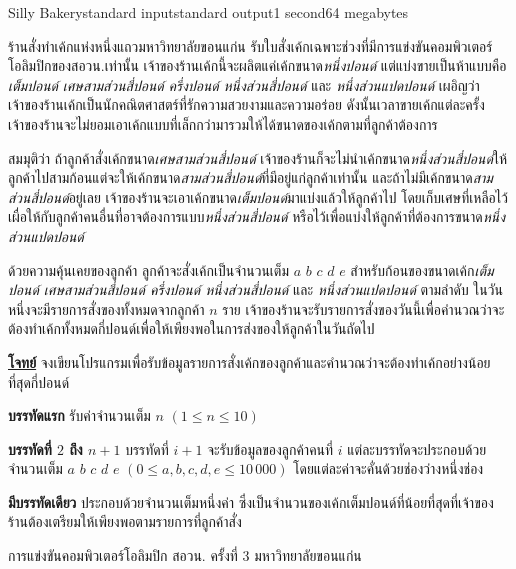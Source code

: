 \documentclass[11pt,a4paper]{article}
\begin{document}
\begin{problem}{Silly Bakery}{standard input}{standard output}{1 second}{64 megabytes}

ร้านสั่งทำเค้กแห่งหนึ่งแถวมหาวิทยาลัยขอนแก่น รับใบสั่งเค้กเฉพาะช่วงที่มีการแข่งขันคอมพิวเตอร์โอลิมปิกของสอวน.เท่านั้น เจ้าของร้านเค้กนี้จะผลิตแค่เค้กขนาด\textit{หนึ่งปอนด์ }แต่แบ่งขายเป็นห้าแบบคือ \textit{เต็มปอนด์} \textit{เศษสามส่วนสี่ปอนด์} \textit{ครึ่งปอนด์} \textit{หนึ่งส่วนสี่ปอนด์} และ \textit{หนึ่งส่วนแปดปอนด์} เผอิญว่าเจ้าของร้านเค้กเป็นนักคณิตศาสตร์ที่รักความสวยงามและความอร่อย ดังนั้นเวลาขายเค้กแต่ละครั้งเจ้าของร้านจะไม่ยอมเอาเค้กแบบที่เล็กกว่ามารวมให้ได้ขนาดของเค้กตามที่ลูกค้าต้องการ

สมมุติว่า ถ้าลูกค้าสั่งเค้กขนาด\textit{เศษสามส่วนสี่ปอนด์} เจ้าของร้านก็จะไม่นำเค้กขนาด\textit{หนึ่งส่วนสี่ปอนด์}ให้ลูกค้าไปสามก้อนแต่จะให้เค้กขนาด\textit{สามส่วนสี่ปอนด์}ที่มีอยู่แก่ลูกค้าเท่านั้น และถ้าไม่มีเค้กขนาด\textit{สามส่วนสี่ปอนด์}อยู่เลย เจ้าของร้านจะเอาเค้กขนาด\textit{เต็มปอนด์}มาแบ่งแล้วให้ลูกค้าไป โดยเก็บเศษที่เหลือไว้เผื่อให้กับลูกค้าคนอื่นที่อาจต้องการแบบ\textit{หนึ่งส่วนสี่ปอนด์} หรือไว้เพื่อแบ่งให้ลูกค้าที่ต้องการขนาด\textit{หนึ่งส่วนแปดปอนด์}

ด้วยความคุ้นเคยของลูกค้า ลูกค้าจะสั่งเค้กเป็นจำนวนเต็ม $a$ $b$ $c$ $d$ $e$ สำหรับก้อนของขนาดเค้ก\textit{เต็มปอนด์ เศษสามส่วนสี่ปอนด์ ครึ่งปอนด์ หนึ่งส่วนสี่ปอนด์} และ\textit{ หนึ่งส่วนแปดปอนด์} ตามลำดับ ในวันหนึ่งจะมีรายการสั่งของทั้งหมดจากลูกค้า $n$ ราย เจ้าของร้านจะรับรายการสั่งของวันนี้เพื่อคำนวณว่าจะต้องทำเค้กทั้งหมดกี่ปอนด์เพื่อให้เพียงพอในการส่งของให้ลูกค้าในวันถัดไป

\underline{\textbf{โจทย์}}  จงเขียนโปรแกรมเพื่อรับข้อมูลรายการสั่งเค้กของลูกค้าและคำนวณว่าจะต้องทำเค้กอย่างน้อยที่สุดกี่ปอนด์

\InputFile

\textbf{บรรทัดแรก} รับค่าจำนวนเต็ม $n$ $( 1\leq  n \leq 10)$

\textbf{บรรทัดที่ $2$ ถึง $n+1$} บรรทัดที่ $i+1$ จะรับข้อมูลของลูกค้าคนที่ $i$ แต่ละบรรทัดจะประกอบด้วยจำนวนเต็ม $a$ $b$ $c$ $d$ $e$  $(0 \leq a,b,c,d,e \leq 10\,000)$ โดยแต่ละค่าจะคั่นด้วยช่องว่างหนึ่งช่อง

\OutputFile

\textbf{มีบรรทัดเดียว} ประกอบด้วยจำนวนเต็มหนึ่งค่า ซึ่งเป็นจำนวนของเค้กเต็มปอนด์ที่น้อยที่สุดที่เจ้าของร้านต้องเตรียมให้เพียงพอตามรายการที่ลูกค้าสั่ง

\Examples

\begin{example}
%
%
\end{example}

\Source

การแข่งขันคอมพิวเตอร์โอลิมปิก สอวน. ครั้งที่ 3 มหาวิทยาลัยขอนแก่น

\end{problem}
\end{document}
